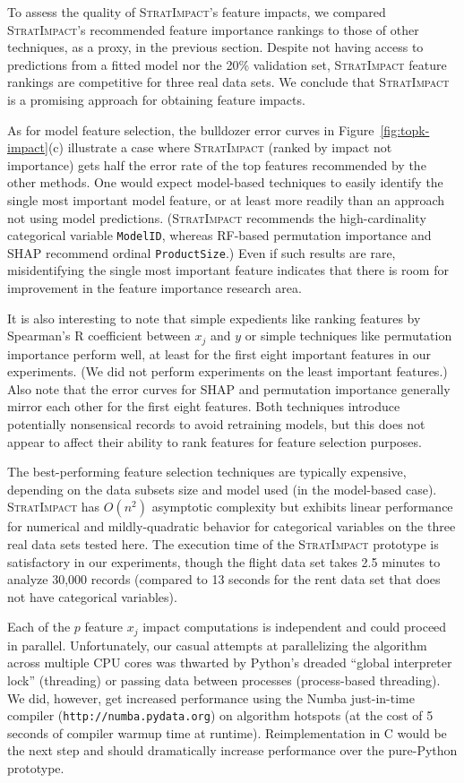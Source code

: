 \documentclass[11pt]{article}
\newcommand{\figref}[1]{Figure~\ref{#1}}
\newcommand{\simp}{\fontfamily{cmr}\textsc{\small StratImpact}}
\begin{document}
To assess the quality of \simp's feature impacts, we compared \simp's recommended feature importance rankings to those of other techniques, as a proxy, in the previous section. Despite not having access to predictions from a fitted model nor the 20\% validation set, \simp{} feature rankings are competitive for three real data sets. We conclude that \simp{} is a promising approach for obtaining feature impacts.  

As for model feature selection, the bulldozer error curves in \figref{fig:topk-impact}(c) illustrate a case where \simp{} (ranked by impact not importance) gets half the error rate of the top features recommended by the other methods.  One would expect model-based techniques to easily identify the single most important model feature, or at least more readily than an approach not using model predictions.  (\simp{} recommends the high-cardinality categorical variable {\tt ModelID}, whereas RF-based permutation importance and SHAP recommend ordinal {\tt ProductSize}.)  Even if such results are rare, misidentifying the single most important feature indicates that there is room for improvement in the feature importance research area. 

It is also interesting to note that simple expedients like ranking features by Spearman's R coefficient between $x_j$ and $y$ or simple techniques like permutation importance perform well, at least for the first eight important features in our experiments. (We did not perform experiments on the least important features.) Also note that the error curves for SHAP and permutation importance generally mirror each other for the first eight features.  Both techniques introduce potentially nonsensical records to avoid retraining models, but this does not appear to affect their ability to rank features for feature selection purposes.

The best-performing feature selection techniques are typically expensive, depending on the data subsets size and model used (in the model-based case).  \simp{} has $O(n^2)$ asymptotic complexity but exhibits linear performance for numerical and mildly-quadratic behavior for categorical variables on the three real data sets tested here.  The execution time of the \simp{} prototype is satisfactory in our experiments, though the flight data set takes 2.5 minutes to analyze 30,000 records (compared to 13 seconds for the rent data set that does not have categorical variables).

Each of the $p$ feature $x_j$ impact computations is independent and could proceed in parallel. Unfortunately, our casual attempts at parallelizing the algorithm across multiple CPU cores was thwarted by Python's dreaded ``global interpreter lock'' (threading) or passing data between processes (process-based threading).  We did, however, get increased performance using the Numba just-in-time compiler ({\tt\small http://numba.pydata.org}) on algorithm hotspots (at the cost of 5 seconds of compiler warmup time at runtime). Reimplementation in C would be the next step and should dramatically increase performance over the pure-Python prototype.
\end{document}
